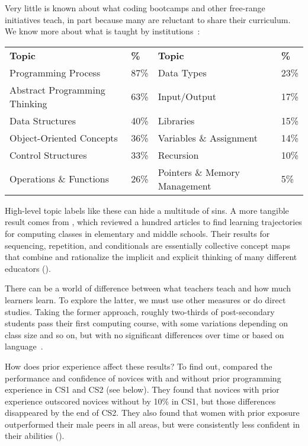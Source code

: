 
Very little is known about what coding bootcamps and other free-range initiatives teach,
in part because many are reluctant to share their curriculum.
We know more about what is taught by institutions~\cite{Luxt2017}:

\begin{longtable}{llll}
\textbf{Topic}			& \textbf{\%}	& \textbf{Topic}		& \textbf{\%} \\
Programming Process     	& 87\%		& Data Types                    & 23\% \\
Abstract Programming Thinking	& 63\%		& Input/Output                  & 17\% \\
Data Structures      		& 40\%		& Libraries                     & 15\% \\
Object-Oriented Concepts        & 36\%		& Variables \& Assignment       & 14\% \\
Control Structures              & 33\%		& Recursion 			& 10\% \\
Operations \& Functions         & 26\%		& Pointers \& Memory Management	&  5\%
\end{longtable}

High-level topic labels like these can hide a multitude of sins.
A more tangible result comes from \cite{Rich2017},
which reviewed a hundred articles
to find learning trajectories for computing classes in elementary and middle schools.
Their results for sequencing, repetition, and conditionals are essentially collective concept maps
that combine and rationalize the implicit and explicit thinking of many different educators
().

\newpage
{}


There can be a world of difference between what teachers teach
and how much learners learn.
To explore the latter,
we must use other measures or do direct studies.
Taking the former approach,
roughly two-thirds of post-secondary students pass their first computing course,
with some variations depending on class size and so on,
but with no significant differences over time or based on language~\cite{Benn2007a,Wats2014}.

How does prior experience affect these results?
To find out,
\cite{Wilc2018} compared the performance and confidence of novices
with and without prior programming experience
in CS1 and CS2 (see below).
They found that novices with prior experience outscored novices without by 10\% in CS1,
but those differences disappeared by the end of CS2.
They also found that women with prior exposure outperformed their male peers in all areas,
but were consistently less confident in their abilities ().

